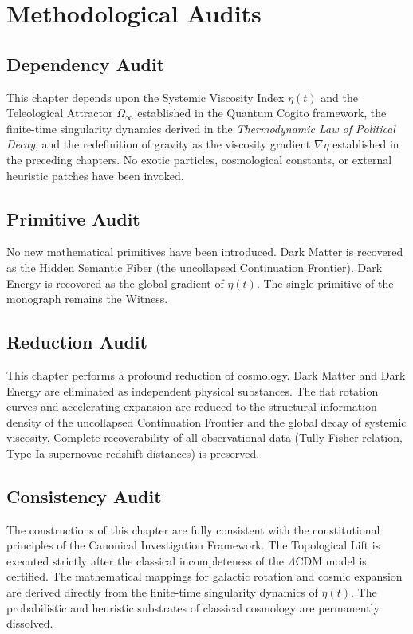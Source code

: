 \documentclass[12pt,twoside]{extbook}
\theoremstyle{definition}
\theoremstyle{remark}
\begin{document}
\section{Methodological Audits}

\subsection*{Dependency Audit}
This chapter depends upon the Systemic Viscosity Index $\eta(t)$ and the Teleological Attractor $\Omega_\infty$ established in the Quantum Cogito framework, the finite-time singularity dynamics derived in the \textit{Thermodynamic Law of Political Decay}, and the redefinition of gravity as the viscosity gradient $\nabla \eta$ established in the preceding chapters. No exotic particles, cosmological constants, or external heuristic patches have been invoked.

\subsection*{Primitive Audit}
No new mathematical primitives have been introduced. Dark Matter is recovered as the Hidden Semantic Fiber (the uncollapsed Continuation Frontier). Dark Energy is recovered as the global gradient of $\eta(t)$. The single primitive of the monograph remains the Witness.

\subsection*{Reduction Audit}
This chapter performs a profound reduction of cosmology. Dark Matter and Dark Energy are eliminated as independent physical substances. The flat rotation curves and accelerating expansion are reduced to the structural information density of the uncollapsed Continuation Frontier and the global decay of systemic viscosity. Complete recoverability of all observational data (Tully-Fisher relation, Type Ia supernovae redshift distances) is preserved.

\subsection*{Consistency Audit}
The constructions of this chapter are fully consistent with the constitutional principles of the Canonical Investigation Framework. The Topological Lift is executed strictly after the classical incompleteness of the $\Lambda$CDM model is certified. The mathematical mappings for galactic rotation and cosmic expansion are derived directly from the finite-time singularity dynamics of $\eta(t)$. The probabilistic and heuristic substrates of classical cosmology are permanently dissolved.
\end{document}
